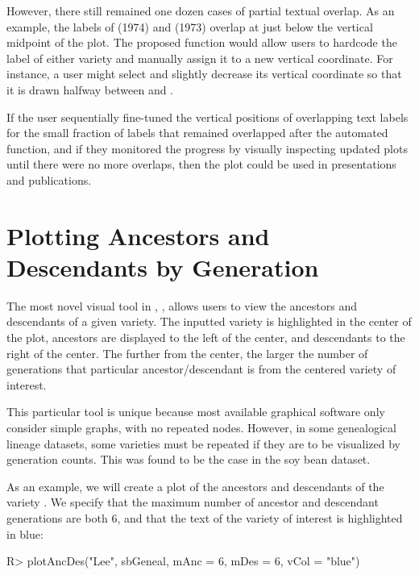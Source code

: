 \documentclass[article,shortnames]{jss}
\begin{document}
However, there still remained one dozen cases of partial textual overlap. As an example, the labels of  (1974) and  (1973) overlap at just below the vertical midpoint of the plot. The proposed function would allow users to hardcode the label of either variety and manually assign it to a new vertical coordinate. For instance, a user might select  and slightly decrease its vertical coordinate so that it is drawn halfway between  and .

If the user sequentially fine-tuned the vertical positions of overlapping text labels for the small fraction of labels that remained overlapped after the automated function, and if they monitored the progress by visually inspecting updated plots until there were no more overlaps, then the plot could be used in presentations and publications.

\section{Plotting Ancestors and Descendants by Generation}

The most novel visual tool in , , allows users to view the ancestors and descendants of a given variety. The inputted variety is highlighted in the center of the plot, ancestors are displayed to the left of the center, and descendants to the right of the center. The further from the center, the larger the number of generations that particular ancestor/descendant is from the centered variety of interest.

This particular  tool is unique because most available graphical software only consider simple graphs, with no repeated nodes. However, in some genealogical lineage datasets, some varieties must be repeated if they are to be visualized by generation counts. This was found to be the case in the soy bean dataset.

As an example, we will create a plot of the ancestors and descendants of the variety . We specify that the maximum number of ancestor and descendant generations are both 6, and that the text of the variety of interest is highlighted in blue:

\begin{Code}
R> plotAncDes("Lee", sbGeneal, mAnc = 6, mDes = 6, vCol = "blue")
\end{Code}
\end{document}
